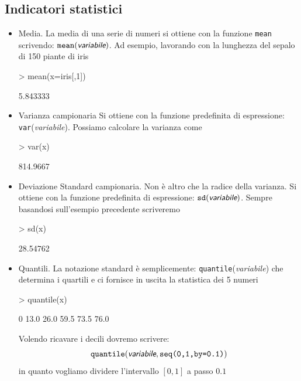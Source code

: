 \documentclass[onecolumn,12pt]{book}
\newcommand{\varia}[1]{\textsl{\textsf{#1}}}
\begin{document}
\subsection{Indicatori statistici}
\begin{itemize}
\item{}Media.\vskip0pt
La media di una serie di numeri si ottiene con la funzione \texttt{mean} scrivendo:
$\texttt{mean}(\varia{variabile})$.
Ad esempio, lavorando con la lunghezza del sepalo di 150 piante di iris
\begin{Schunk}
\begin{Sinput}
> mean(x=iris[,1])
\end{Sinput}
\begin{Soutput}
[1] 5.843333
\end{Soutput}
\end{Schunk}
\item{}Varianza campionaria\vskip0pt
Si ottiene con la funzione predefinita di espressione:
\texttt{var}(\varia{variabile}).
Possiamo calcolare la varianza come
\begin{Schunk}
\begin{Sinput}
> var(x)
\end{Sinput}
\begin{Soutput}
[1] 814.9667
\end{Soutput}
\end{Schunk}
\item{}Deviazione Standard campionaria.\vskip0pt
Non \`e altro che la radice della varianza. Si ottiene con la funzione predefinita di espressione:
$\texttt{sd}(\varia{variabile})$.
Sempre basandosi sull'esempio precedente scriveremo
\begin{Schunk}
\begin{Sinput}
> sd(x)
\end{Sinput}
\begin{Soutput}
[1] 28.54762
\end{Soutput}
\end{Schunk}

\item{}Quantili. La notazione standard \`e semplicemente: \texttt{quantile}(\varia{variabile}) che determina i quartili e ci fornisce in uscita la statistica dei 5 numeri

\begin{Schunk}
\begin{Sinput}
> quantile(x)
\end{Sinput}
\begin{Soutput}
  0%
13.0 26.0 59.5 73.5 76.0 
\end{Soutput}
\end{Schunk}
 Volendo ricavare i decili dovremo scrivere:
$$\texttt{quantile}(\varia{variabile},\texttt{seq(0,1,by=0.1)})$$
in quanto vogliamo dividere l'intervallo $[0,1]$ a passo $0.1$


\end{itemize}
\end{document}
